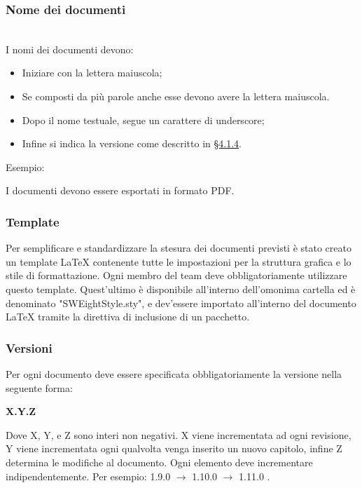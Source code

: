 \subsubsection{Nome dei documenti}\mbox{}\\
I nomi dei documenti devono:
\begin{itemize}
\item Iniziare con la lettera maiuscola;
\item Se composti da più parole anche esse devono avere la lettera maiuscola.
\item Dopo il nome testuale, segue un carattere di underscore;
\item Infine si indica la versione come descritto in \hyperref[sec:documentversion]{§4.1.4}.
\end{itemize}
Esempio:
\begin{center}
\end{center}
I documenti devono essere esportati in formato PDF.

\subsubsection{Template}
Per semplificare e standardizzare la stesura dei documenti previsti è stato creato un template \LaTeX{} contenente tutte le impostazioni per la struttura grafica e lo stile di formattazione. Ogni membro del team deve obbligatoriamente utilizzare questo {template}.
Quest'ultimo è disponibile all'interno dell'omonima cartella ed è denominato "SWEightStyle.sty", e dev'essere importato all'interno del documento \LaTeX{} tramite la direttiva di inclusione di un pacchetto.
\subsubsection{Versioni}
\label{sec:documentversion}
Per ogni documento deve essere specificata obbligatoriamente la versione nella seguente forma: 
\begin{center}
\textbf{X.Y.Z}
\end{center}
Dove X, Y, e Z sono interi non negativi. X viene incrementata ad ogni revisione, Y viene incrementata ogni qualvolta venga inserito un nuovo capitolo, infine Z determina le modifiche al documento. Ogni elemento deve incrementare indipendentemente. Per esempio: 1.9.0 $\rightarrow$ 1.10.0 $\rightarrow$ 1.11.0 .

